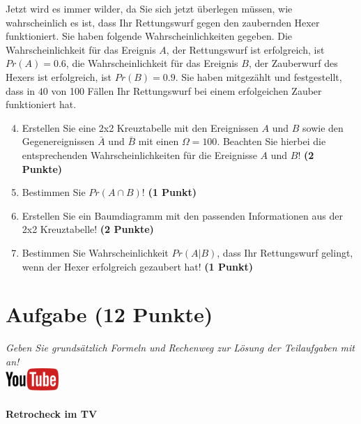 \documentclass[a4paper, 9pt]{scrartcl}\usepackage[]{graphicx}\usepackage[]{xcolor}
\begin{document}
Jetzt wird es immer wilder, da Sie sich jetzt {\"u}berlegen m{\"u}ssen, wie
wahrscheinlich es ist, dass Ihr Rettungswurf gegen den zaubernden Hexer
funktioniert. Sie haben folgende Wahrscheinlichkeiten gegeben. Die
Wahrscheinlichkeit f{\"u}r das Ereignis $A$, der Rettungswurf ist erfolgreich,
ist $Pr(A) = 0.6$, die Wahrscheinlichkeit f{\"u}r das Ereignis $B$,
der Zauberwurf des Hexers ist erfolgreich, ist $Pr(B) = 0.9$. Sie
haben mitgez{\"a}hlt und festgestellt, dass in $40$ von 100 F{\"a}llen
Ihr Rettungswurf bei einem erfolgeichen Zauber funktioniert hat.  

\begin{enumerate}
  \setcounter{enumi}{3}
\item Erstellen Sie eine 2x2 Kreuztabelle mit den Ereignissen $A$ und $B$
  sowie den Gegenereignissen $\bar{A}$ und $\bar{B}$ mit einen
  $\Omega = 100$. Beachten Sie hierbei die entsprechenden
  Wahrscheinlichkeiten f{\"u}r die Ereignisse $A$ und $B$! \textbf{(2 Punkte)}
\item Bestimmen Sie $Pr(A \cap B)$! \textbf{(1 Punkt)}
\item Erstellen Sie ein Baumdiagramm mit den passenden Informationen aus der 2x2
  Kreuztabelle! \textbf{(2 Punkte)}
\item Bestimmen Sie Wahrscheinlichkeit $Pr(A|B)$, dass Ihr Rettungswurf gelingt, wenn
  der Hexer erfolgreich gezaubert hat! \textbf{(1 Punkt)}
\end{enumerate}

  
\clearpage

\section{Aufgabe \hfill (12 Punkte)}

\textit{Geben Sie grunds{\"a}tzlich Formeln und Rechenweg zur L{\"o}sung der
  Teilaufgaben mit an!} \\[1Ex]

\hfill\href{https://youtu.be/9DQKaXdxT_g}{\includegraphics[width =
  2cm]{img/youtube}} %
\hspace{2Ex}

\paragraph{Retrocheck im TV}
\end{document}
